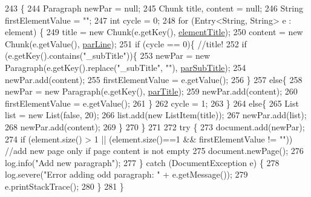 \begin{DoxyCode}
243                                                                                      \{
244         Paragraph newPar = null;
245         Chunk title, content = null;
246         String firstElementValue = \textcolor{stringliteral}{""};
247         \textcolor{keywordtype}{int} cycle = 0;
248         \textcolor{keywordflow}{for} (Entry<String, String> e : element) \{
249             title = \textcolor{keyword}{new} Chunk(e.getKey(), \hyperlink{classit_1_1isislab_1_1masonassisteddocumentation_1_1mason_1_1control_1_1_pdf_rtf_generator_aa954332a7d987f1b6b8957fa25ee6190}{elementTitle});
250             content = \textcolor{keyword}{new} Chunk(e.getValue(), \hyperlink{classit_1_1isislab_1_1masonassisteddocumentation_1_1mason_1_1control_1_1_pdf_rtf_generator_ae24c4a1666a5d601e16f3c3cb7a81fdb}{parLine});
251             \textcolor{keywordflow}{if} (cycle == 0)\{    \textcolor{comment}{//title!}
252                 \textcolor{keywordflow}{if} (e.getKey().contains(\textcolor{stringliteral}{"\_subTitle"}))\{
253                     newPar = \textcolor{keyword}{new} Paragraph(e.getKey().replace(\textcolor{stringliteral}{"\_subTitle"}, \textcolor{stringliteral}{""}), 
      \hyperlink{classit_1_1isislab_1_1masonassisteddocumentation_1_1mason_1_1control_1_1_pdf_rtf_generator_ae31536bac40b23df15fbb252e60c03bb}{parSubTitle});
254                     newPar.add(content);
255                     firstElementValue = e.getValue();
256                 \}
257                 \textcolor{keywordflow}{else}\{
258                     newPar = \textcolor{keyword}{new} Paragraph(e.getKey(), \hyperlink{classit_1_1isislab_1_1masonassisteddocumentation_1_1mason_1_1control_1_1_pdf_rtf_generator_a3f130f576b5be4a3a82d7c59347c0869}{parTitle});
259                     newPar.add(content);
260                     firstElementValue = e.getValue();
261                 \}
262                 cycle = 1;
263             \}
264             \textcolor{keywordflow}{else}\{
265                 List list = \textcolor{keyword}{new} List(\textcolor{keyword}{false}, 20);
266                 list.add(\textcolor{keyword}{new} ListItem(title));
267                 newPar.add(list);
268                 newPar.add(content);
269             \}
270         \}
271 
272         \textcolor{keywordflow}{try} \{           
273             document.add(newPar);
274             \textcolor{keywordflow}{if} (element.size() > 1 || (element.size()==1 && firstElementValue != \textcolor{stringliteral}{""}))   \textcolor{comment}{//add new page only
       if page content is not empty}
275                 document.newPage();
276             log.info(\textcolor{stringliteral}{"Add new paragraph"});
277         \} \textcolor{keywordflow}{catch} (DocumentException e) \{
278             log.severe(\textcolor{stringliteral}{"Error adding odd paragraph: "} + e.getMessage());
279             e.printStackTrace();
280         \}
281     \}
\end{DoxyCode}


